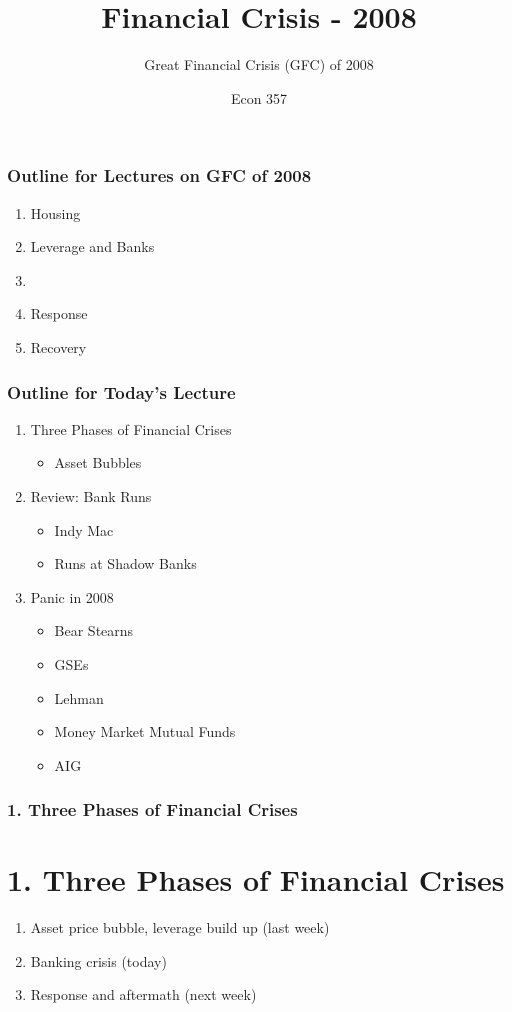 \documentclass{beamer}
\title{Financial Crisis - 2008}
\subtitle{Great Financial Crisis (GFC) of 2008}
\author{Econ 357}
\date{\week}
\begin{document}
\frame{\titlepage}

\begin{frame}
    \frametitle{Outline for Lectures on GFC of 2008}

    \begin{enumerate}
        \item Housing
        \item Leverage and Banks
        \item {}
        \item Response
        \item Recovery
    \end{enumerate}
    \vspace{1em}

\end{frame}

\begin{frame}
    \frametitle{Outline for Today's Lecture}
    
\begin{enumerate}
    \item Three Phases of Financial Crises
    \begin{itemize}
        \item Asset Bubbles
    \end{itemize}
    \item Review: Bank Runs
    \begin{itemize}
        \item Indy Mac
        \item Runs at Shadow Banks
    \end{itemize}
    \item Panic in 2008
    \begin{itemize}
        \item Bear Stearns
        \item GSEs
        \item Lehman
        \item Money Market Mutual Funds
        \item AIG
    \end{itemize}
\end{enumerate}

\end{frame}

\begin{frame}[t]
    \frametitle{1. Three Phases of Financial Crises}
    \section*{1. Three Phases of Financial Crises}

    \begin{enumerate}
        \item Asset price bubble, leverage build up (last week)
        \item Banking crisis (today)
        \item Response and aftermath (next week)
    \end{enumerate}

\end{frame}
\end{document}
